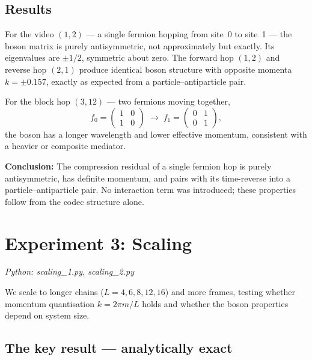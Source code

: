 \documentclass[11pt]{article}
\begin{document}
\subsection*{Results}

For the video $(1, 2)$ --- a single fermion hopping from site~0 to site~1 ---
the boson matrix is purely antisymmetric, not approximately but exactly.
Its eigenvalues are $\pm 1/2$, symmetric about zero.
The forward hop $(1,2)$ and reverse hop $(2,1)$ produce identical boson
structure with opposite momenta $k = \pm 0.157$, exactly as expected from a
particle--antiparticle pair.

For the block hop $(3,12)$ --- two fermions moving together,
\[
  f_0 = \begin{pmatrix}1&0\\1&0\end{pmatrix}
  \;\longrightarrow\;
  f_1 = \begin{pmatrix}0&1\\0&1\end{pmatrix},
\]
the boson has a longer wavelength and lower effective
momentum, consistent with a heavier or composite mediator.

\textbf{Conclusion:} The compression residual of a single fermion hop is purely
antisymmetric, has definite momentum, and pairs with its time-reverse into a
particle--antiparticle pair.
No interaction term was introduced; these properties follow from the codec
structure alone.

\section{Experiment 3: Scaling}
\label{sec:exp3}

\textit{Python: scaling\_1.py, scaling\_2.py}

We scale to longer chains ($L = 4, 6, 8, 12, 16$) and more frames, testing
whether momentum quantisation $k = 2\pi m/L$ holds and whether the boson
properties depend on system size.

\subsection*{The key result --- analytically exact}
\end{document}
